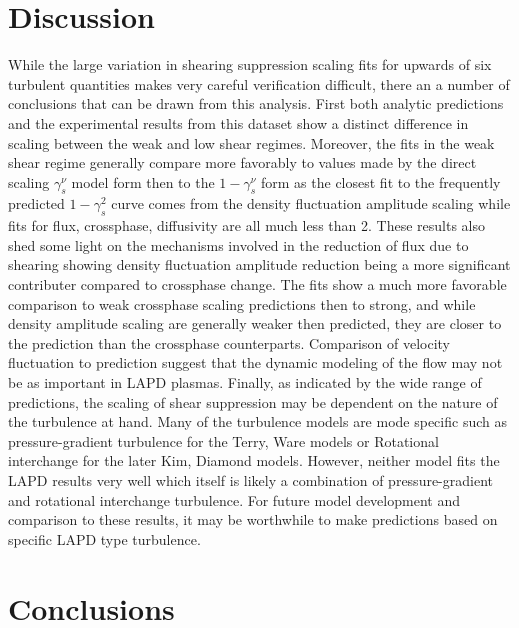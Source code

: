 \documentclass[aip,pop,amsmath,amssymb,preprint,superscriptaddress]{revtex4-1} %
\begin{document}
\section{Discussion}

While the large variation in shearing suppression scaling fits for upwards of six turbulent quantities makes very careful verification difficult, there an a number of conclusions that can be drawn from this analysis. First both analytic predictions and the experimental results from this dataset show a distinct difference in scaling between the weak and low shear regimes. Moreover, the fits in the weak shear regime generally compare more favorably to values made by the direct scaling $\gamma_{s}^{\nu}$ model form then to the $1-\gamma_{s}^{\nu}$ form as the closest fit to the frequently predicted $1-\gamma_{s}^{2}$ curve comes from the density fluctuation amplitude scaling while fits for flux, crossphase, diffusivity are all much less than 2. These results also shed some light on the mechanisms involved in the reduction of flux due to shearing showing density fluctuation amplitude reduction being a more significant contributer compared to crossphase change. The fits show a much more favorable comparison to weak crossphase scaling predictions then to strong, and while density amplitude scaling are generally weaker then predicted, they are closer to the prediction than the crossphase counterparts. Comparison of velocity fluctuation to prediction suggest that the dynamic modeling of the flow may not be as important in LAPD plasmas. Finally, as indicated by the wide range of predictions, the scaling of shear suppression may be dependent on the nature of the turbulence at hand. Many of the turbulence models are mode specific such as pressure-gradient turbulence for the Terry, Ware models or Rotational interchange for the later Kim, Diamond models. However, neither model fits the LAPD results very well which itself is likely a combination of pressure-gradient and rotational interchange turbulence. For future model development and comparison to these results, it may be worthwhile to make predictions based on specific LAPD type turbulence.

\section{Conclusions}
\end{document}
